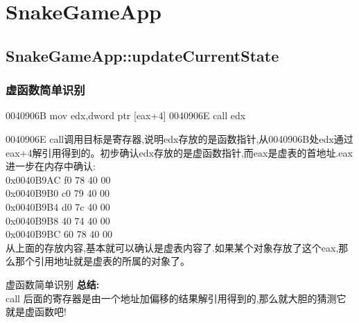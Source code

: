 \documentclass[AutoFakeBold,AutoFakeSlant]{beamer}
\begin{document}
	
	
	\section{SnakeGameApp}
	\subsection{SnakeGameApp::updateCurrentState}
	
	\begin{frame}[fragile]
		\frametitle{虚函数简单识别}
		\begin{x86asmcode}
0040906B  mov   edx,dword ptr [eax+4]  
0040906E  call  edx\end{x86asmcode}
		0040906E call调用目标是寄存器,说明edx存放的是函数指针,从0040906B处edx通过eax+4解引用得到的。初步确认edx存放的是虚函数指针,而eax是虚表的首地址.eax进一步在内存中确认:\\
		0x0040B9AC  f0 78 40 00  \\
		0x0040B9B0  c0 79 40 00  \\
		0x0040B9B4  d0 7c 40 00  \\
		0x0040B9B8  40 74 40 00  \\
		0x0040B9BC  60 78 40 00  \\
		从上面的存放内容,基本就可以确认是虚表内容了.如果某个对象存放了这个eax,那么那个引用地址就是虚表的所属的对象了。
	\end{frame}
	
	\begin{frame}[fragile]{虚函数简单识别}
	    \textbf{总结:} \\ call 后面的寄存器是由一个地址加偏移的结果解引用得到的,那么就大胆的猜测它就是虚函数吧!	
	\end{frame}
	
\end{document}
